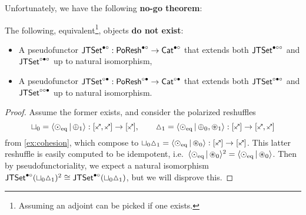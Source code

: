 \documentclass[a4paper]{memoir}
\begin{document}
Unfortunately, we have the following \textbf{no-go theorem}:
\begin{theorem} \label{thm:poresh-jtset:nogo}
	The following, equivalent\footnote{Assuming an adjoint can be picked if one exists.}, objects \textbf{do not exist}:
	\begin{itemize}
		\item A pseudofunctor $\mathsf{JTSet}^{\bullet \circ} : \mathsf{PoResh}^{\bullet \circ} \to {\mathsf{Cat}}^{\bullet \circ}$ that extends both $\mathsf{JTSet}^{\bullet \circ \circ}$ and $\mathsf{JTSet}^{\circ \bullet \circ}$ up to natural isomorphism,
		\item A pseudofunctor $\mathsf{JTSet}^{\circ \bullet} : \mathsf{PoResh}^{\circ \bullet} \to {\mathsf{Cat}}^{\circ \bullet}$ that extends both $\mathsf{JTSet}^{\circ \bullet \circ}$ and $\mathsf{JTSet}^{\circ \circ \bullet}$ up to natural isomorphism.
	\end{itemize}
\end{theorem}
\begin{proof}
	Assume the former exists, and consider the polarized reshuffles
	\[
		\cohfget_0 = \reshlist{\nonpol_\eqtydeg}{\pospol_1} : [\ypolar, \ypolar] \to [\ypolar], \qquad
		\cohdisc_1 = \reshlist{\nonpol_\eqtydeg}{\pospol_0, \isopol_1} : [\ypolar] \to [\ypolar, \ypolar]
	\]
	from \cref{ex:cohesion}, which compose to $\cohfget_0 \cohdisc_1 = \reshlist{\nonpol_\eqtydeg}{\isopol_0} : [\ypolar] \to [\ypolar]$.
	This latter reshuffle is easily computed to be idempotent, i.e.\ $\mathopen{}\left\langle {\odot}_{\mathrm{eq}} \,\middle|\, {\oast}_0 \right\rangle\mathclose{}^2 = \mathopen{}\left\langle {\odot}_{\mathrm{eq}} \,\middle|\, {\oast}_0 \right\rangle\mathclose{}$.
	Then by pseudofunctoriality, we expect a natural isomorphism $\mathsf{JTSet}^{\bullet \circ}({\sqcup}_0 {\vartriangle}_1)^2 \cong \mathsf{JTSet}^{\bullet \circ}({\sqcup}_0 {\vartriangle}_1)$, but we will disprove this.
	

\end{proof}
\end{document}
